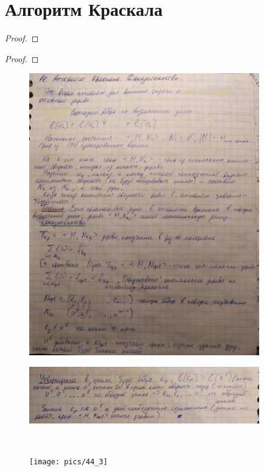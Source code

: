 \documentclass[discrete.tex]{subfiles}
\begin{document}
  \section{Алгоритм Краскала}

  \begin{alg}[Краскала]

  \end{alg}

  \begin{theorem}

  \end{theorem}

  \begin{proof}

  \end{proof}

  \begin{theorem}

  \end{theorem}

  \begin{proof}

  \end{proof}
  \begin{figure}[H]
          \includegraphics[width=10cm]{pics/44_1}
          \centering
  \end{figure}
  \begin{figure}[H]
          \includegraphics[width=10cm]{pics/44_2}
          \centering
  \end{figure}

  \begin{Example} \
    \begin{figure}[H]
            \texttt{[image: pics/44\_3]}
            \centering
    \end{figure}
  \end{Example}
\end{document}
